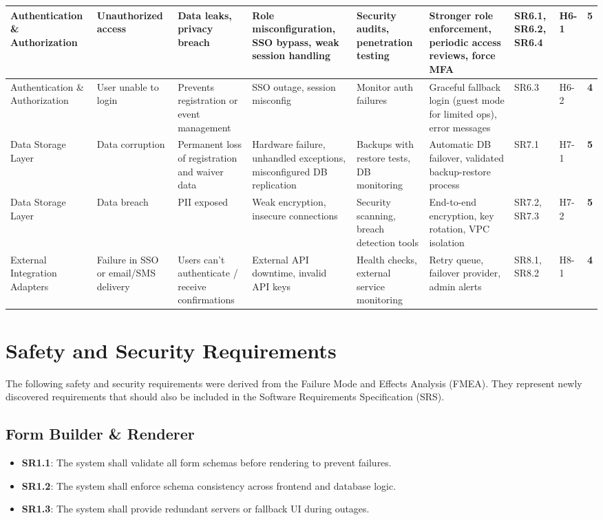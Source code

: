 \documentclass[12pt]{article}
\begin{document}
\begin{longtable}{|L{2.0cm}|L{1.8cm}|L{1.9cm}|L{1.9cm}|L{1.8cm}|L{2.4cm}|L{0.9cm}|L{1.1cm}|L{1cm}|}
\hline
Authentication \& Authorization & Unauthorized access & Data leaks, privacy breach & Role misconfiguration, SSO bypass, weak session handling & Security audits, penetration testing & Stronger role enforcement, periodic access reviews, force MFA & SR6.1, SR6.2, SR6.4 & H6-1 & \textbf{5} \\
\hline
Authentication \& Authorization & User unable to login & Prevents registration or event management & SSO outage, session misconfig & Monitor auth failures & Graceful fallback login (guest mode for limited ops), error messages & SR6.3 & H6-2 & \textbf{4} \\
\hline
Data Storage Layer & Data corruption & Permanent loss of registration and waiver data & Hardware failure, unhandled exceptions, misconfigured DB replication & Backups with restore tests, DB monitoring & Automatic DB failover, validated backup-restore process & SR7.1 & H7-1 & \textbf{5} \\
\hline
Data Storage Layer & Data breach & PII exposed & Weak encryption, insecure connections & Security scanning, breach detection tools & End-to-end encryption, key rotation, VPC isolation & SR7.2, SR7.3 & H7-2 & \textbf{5} \\
\hline
External Integration Adapters & Failure in SSO or email/SMS delivery & Users can't authenticate / receive confirmations & External API downtime, invalid API keys & Health checks, external service monitoring & Retry queue, failover provider, admin alerts & SR8.1, SR8.2 & H8-1 & \textbf{4} \\
\hline
\end{longtable}
\endgroup



\section{Safety and Security Requirements}

The following safety and security requirements were derived from the Failure Mode and Effects Analysis (FMEA).
They represent newly discovered requirements that should also be included in the Software Requirements Specification (SRS).

\subsection{Form Builder \& Renderer}
\begin{itemize}
    \item \textbf{SR1.1}: The system shall validate all form schemas before rendering to prevent failures.
    \item \textbf{SR1.2}: The system shall enforce schema consistency across frontend and database logic.
    \item \textbf{SR1.3}: The system shall provide redundant servers or fallback UI during outages.
\end{itemize}
\end{document}
